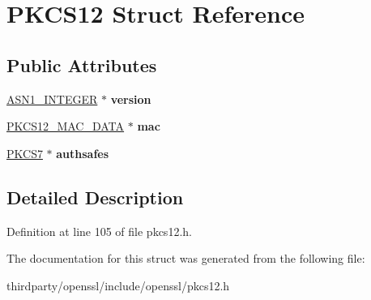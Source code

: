 \hypertarget{struct_p_k_c_s12}{}\section{P\+K\+C\+S12 Struct Reference}
\label{struct_p_k_c_s12}
\subsection*{Public Attributes}
\begin{DoxyCompactItemize}
\item 
\mbox{\label{struct_p_k_c_s12_a36ed18715f06725345e12b6f9904e908}} 
\hyperlink{structasn1__string__st}{A\+S\+N1\+\_\+\+I\+N\+T\+E\+G\+ER} $\ast$ {\bfseries version}
\item 
\mbox{\label{struct_p_k_c_s12_a5184aa35cbf7f56ab133402077c9ea8e}} 
\hyperlink{struct_p_k_c_s12___m_a_c___d_a_t_a}{P\+K\+C\+S12\+\_\+\+M\+A\+C\+\_\+\+D\+A\+TA} $\ast$ {\bfseries mac}
\item 
\mbox{\label{struct_p_k_c_s12_ab861e41463d92627b4ff4a42ca1d2cee}} 
\hyperlink{structpkcs7__st}{P\+K\+C\+S7} $\ast$ {\bfseries authsafes}
\end{DoxyCompactItemize}


\subsection{Detailed Description}


Definition at line 105 of file pkcs12.\+h.



The documentation for this struct was generated from the following file\+:\begin{DoxyCompactItemize}
\item 
thirdparty/openssl/include/openssl/pkcs12.\+h\end{DoxyCompactItemize}
